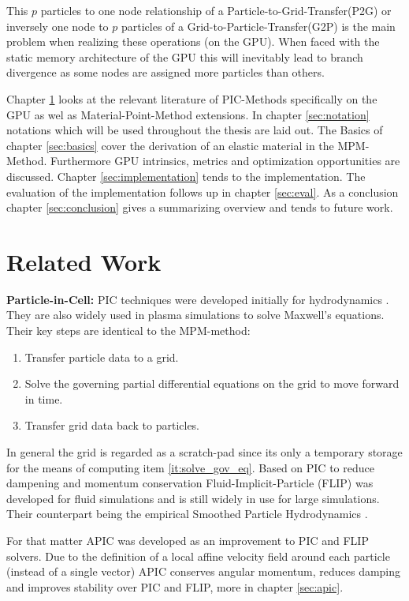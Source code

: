 \documentclass[m,times]{cgMA}
\begin{document}
This $p$ particles to one node relationship of a Particle-to-Grid-Transfer(P2G) or inversely one node to $p$ particles of a Grid-to-Particle-Transfer(G2P) is the main problem when realizing these operations (on the GPU). When faced with the static memory architecture of the GPU this will inevitably lead to branch divergence as some nodes are assigned more particles than others.

Chapter \ref{sec:rel_work} looks at the relevant literature of PIC-Methods specifically on the GPU as wel as Material-Point-Method extensions. In chapter \ref{sec:notation} notations which will be used throughout the thesis are laid out. The Basics of chapter \ref{sec:basics} cover the derivation of an elastic material in the MPM-Method. Furthermore GPU intrinsics, metrics and optimization opportunities are discussed. Chapter \ref{sec:implementation} tends to the implementation. The evaluation of the implementation follows up in chapter \ref{sec:eval}. As a conclusion chapter \ref{sec:conclusion} gives a summarizing overview and tends to future work.

\clearpage
\section{Related Work}\label{sec:rel_work}
\textbf{Particle-in-Cell:} PIC techniques were developed initially for hydrodynamics
\cite{evans1957particle}. They are also widely used in plasma simulations to solve Maxwell's equations. Their key steps are identical to the MPM-method:
\begin{enumerate}
  \item Transfer particle data to a grid.
\item \label{it:solve_gov_eq}Solve the governing partial differential equations on the grid to move forward in time.
  \item Transfer grid data back to particles.
\end{enumerate}
In general the grid is regarded as a scratch-pad since its only a temporary storage for the means of computing item \ref{it:solve_gov_eq}. Based on PIC to reduce dampening and momentum conservation Fluid-Implicit-Particle (FLIP) was developed for fluid simulations and is still widely in use for large simulations. Their counterpart being the empirical Smoothed Particle Hydrodynamics \cite{gingold1977smoothed}.

For that matter APIC was developed as an improvement to PIC and FLIP solvers. Due to the definition of a local affine velocity field around each particle (instead of a single vector) APIC conserves angular momentum, reduces damping and improves stability over PIC and FLIP, more in chapter \ref{sec:apic}. \cite{MPM:APIC} \cite{MPM:OLD_APIC}
\end{document}
